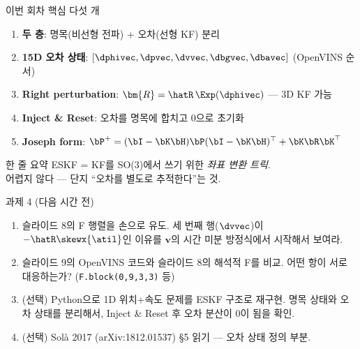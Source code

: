 \begin{frame}{이번 회차 핵심 다섯 개}
  \begin{enumerate}
    \item \textbf{두 층}: 명목(비선형 전파) + 오차(선형 KF) 분리
    \item \textbf{15D 오차 상태}: $[\dphivec, \dpvec, \dvvec, \dbgvec, \dbavec]$ (OpenVINS 순서)
    \item \textbf{Right perturbation}: $\bm{R} = \hatR\,\Exp(\dphivec)$ — 3D KF 가능
    \item \textbf{Inject \& Reset}: 오차를 명목에 합치고 0으로 초기화
    \item \textbf{Joseph form}: $\bP^+ = (\bI-\bK\bH)\bP(\bI-\bK\bH)^\top + \bK\bR\bK^\top$
  \end{enumerate}
  \vspace{0.4em}
  \begin{block}{한 줄 요약}
    ESKF = KF를 SO(3)에서 쓰기 위한 \emph{좌표 변환 트릭}.\\
    어렵지 않다 — 단지 ``오차를 별도로 추적한다''는 것.
  \end{block}
\end{frame}

\begin{frame}{과제 4 (다음 시간 전)}
  \begin{enumerate}
    \item 슬라이드 8의 F 행렬을 손으로 유도. 세 번째 행($\dvvec$)이 $-\hatR\skewx{\atil}$인 이유를
          $\bm{v}$의 시간 미분 방정식에서 시작해서 보여라.
    \item 슬라이드 9의 OpenVINS 코드와 슬라이드 8의 해석적 F를 비교.
          어떤 항이 서로 대응하는가? (\texttt{F.block(0,9,3,3)} 등)
    \item (선택) Python으로 1D 위치+속도 문제를 ESKF 구조로 재구현.
          명목 상태와 오차 상태를 분리해서, Inject \& Reset 후 오차 분산이 0이 됨을 확인.
    \item (선택) Solà 2017 (arXiv:1812.01537) §5 읽기 — 오차 상태 정의 부분.
  \end{enumerate}
\end{frame}

